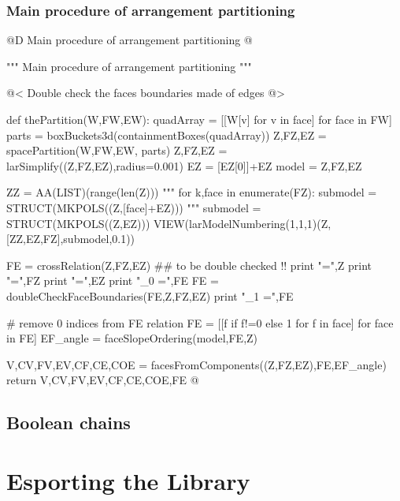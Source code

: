 \documentclass[11pt,oneside]{article}    %
\begin{document}
\subsubsection{Main procedure of arrangement partitioning}

@D Main procedure of arrangement partitioning
@{""" Main procedure of arrangement partitioning """

@< Double check the faces boundaries made of edges @>

def thePartition(W,FW,EW):
    quadArray = [[W[v] for v in face] for face in FW]
    parts = boxBuckets3d(containmentBoxes(quadArray))
    Z,FZ,EZ = spacePartition(W,FW,EW, parts)
    Z,FZ,EZ = larSimplify((Z,FZ,EZ),radius=0.001)
    EZ = [EZ[0]]+EZ
    model = Z,FZ,EZ

    ZZ = AA(LIST)(range(len(Z)))
    """
    for k,face in enumerate(FZ):
        submodel = STRUCT(MKPOLS((Z,[face]+EZ)))
    """
    submodel = STRUCT(MKPOLS((Z,EZ)))
    VIEW(larModelNumbering(1,1,1)(Z,[ZZ,EZ,FZ],submodel,0.1)) 

    FE = crossRelation(Z,FZ,EZ) ## to be double checked !!
    print "\nZ =",Z
    print "\nFZ =",FZ
    print "\nEZ =",EZ
    print "\nFE_0 =",FE
    FE = doubleCheckFaceBoundaries(FE,Z,FZ,EZ)
    print "\nFE_1 =",FE
    
    # remove 0 indices from FE relation
    FE = [[f  if f!=0 else 1 for f in face] for face in FE]
    EF_angle = faceSlopeOrdering(model,FE,Z)
    
    V,CV,FV,EV,CF,CE,COE = facesFromComponents((Z,FZ,EZ),FE,EF_angle)
    return V,CV,FV,EV,CF,CE,COE,FE
@}




\subsection{Boolean chains}

\section{Esporting the Library}
\end{document}
